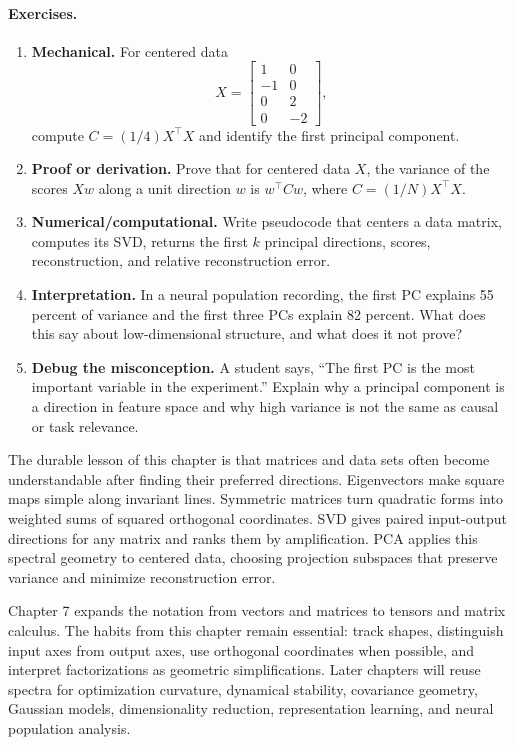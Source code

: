 \paragraph{Exercises.}
\begin{enumerate}[label=\textbf{6.4.\arabic*.}, leftmargin=*]
\item \textbf{Mechanical.} For centered data
\[
X=
\begin{bmatrix}
1&0\\
-1&0\\
0&2\\
0&-2
\end{bmatrix},
\]
compute \(C=(1/4)X^\top X\) and identify the first principal component.
\item \textbf{Proof or derivation.} Prove that for centered data \(X\), the variance of the scores \(Xw\) along a unit direction \(w\) is \(w^\top Cw\), where \(C=(1/N)X^\top X\).
\item \textbf{Numerical/computational.} Write pseudocode that centers a data matrix, computes its SVD, returns the first \(k\) principal directions, scores, reconstruction, and relative reconstruction error.
\item \textbf{Interpretation.} In a neural population recording, the first PC explains 55 percent of variance and the first three PCs explain 82 percent. What does this say about low-dimensional structure, and what does it not prove?
\item \textbf{Debug the misconception.} A student says, ``The first PC is the most important variable in the experiment.'' Explain why a principal component is a direction in feature space and why high variance is not the same as causal or task relevance.
\end{enumerate}

The durable lesson of this chapter is that matrices and data sets often become understandable after finding their preferred directions. Eigenvectors make square maps simple along invariant lines. Symmetric matrices turn quadratic forms into weighted sums of squared orthogonal coordinates. SVD gives paired input-output directions for any matrix and ranks them by amplification. PCA applies this spectral geometry to centered data, choosing projection subspaces that preserve variance and minimize reconstruction error.

Chapter 7 expands the notation from vectors and matrices to tensors and matrix calculus. The habits from this chapter remain essential: track shapes, distinguish input axes from output axes, use orthogonal coordinates when possible, and interpret factorizations as geometric simplifications. Later chapters will reuse spectra for optimization curvature, dynamical stability, covariance geometry, Gaussian models, dimensionality reduction, representation learning, and neural population analysis.

\clearpage
